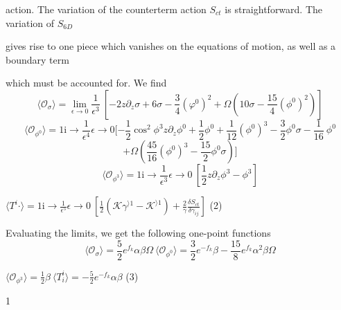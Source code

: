 \documentclass[a4paper,12pt]{article}
\begin{document}
action. The variation of the counterterm action $S_{ct}$ is straightforward. The variation of $S_{6D}$

gives rise to one piece which vanishes on the equations of motion, as well as a boundary term

which must be accounted for. We find
$$
\langle \mathcal{O}_{\sigma}\rangle=\lim_{\epsilon\rightarrow 0}\frac{1}{\epsilon^{3}}\ [-2z\partial_{z}\sigma+6\sigma-\frac{3}{4}(\varphi^{0})^{2}+\Omega(10\sigma-\frac{15}{4}(\phi^{0})^{2})]
$$
$$
\langle \mathcal{O}_{\phi^{0}}\rangle=1\mathrm{i}\rightarrow\frac{1}{\epsilon^{4}}\epsilon\rightarrow 0[-\frac{1}{2}\cos^{2}\phi^{3}z\partial_{z}\phi^{0}+\frac{1}{2}\phi^{0}+\frac{1}{12}(\phi^{0})^{3}-\frac{3}{2}\phi^{0}\sigma-\frac{1}{16}\ \phi^{0}
$$
$$
+\Omega(\frac{45}{16}(\phi^{0})^{3}-\frac{15}{2}\phi^{0}\sigma)]
$$
$$
\langle \mathcal{O}_{\phi^{3}}\rangle=1\mathrm{i}\rightarrow\frac{1}{\epsilon^{3}}\epsilon\rightarrow 0\ [\frac{1}{2}z\partial_{z}\phi^{3}-\phi^{3}]
$$
\begin{center}
$\displaystyle \langle T^{i}\cdot\rangle=1\mathrm{i}\rightarrow\frac{1}{\epsilon^{5}}\epsilon\rightarrow 0\ [\frac{1}{2}(\mathcal{K}\gamma^{\rangle 1}-\mathcal{K}^{\rangle 1})+\frac{2}{\gamma}\frac{\delta S_{ct}}{\delta\gamma_{ij}}]$   (2)
\end{center}
Evaluating the limits, we get the following one-point functions
$$
\langle \mathcal{O}_{\sigma}\rangle=\frac{5}{2}e^{f_{k}}\alpha\beta\Omega\ \langle \mathcal{O}_{\phi^{0}}\rangle=\frac{3}{2}e^{-f_{k}}\beta-\frac{15}{8}e^{f_{k}}\alpha^{2}\beta\Omega
$$
\begin{center}
$\displaystyle \langle \mathcal{O}_{\phi^{3}}\rangle=\frac{1}{2}\beta\ \langle T_{i}^{i}\rangle=-\frac{5}{2}e^{-f_{k}}\alpha\beta$   (3)
\end{center}
1
\end{document}
